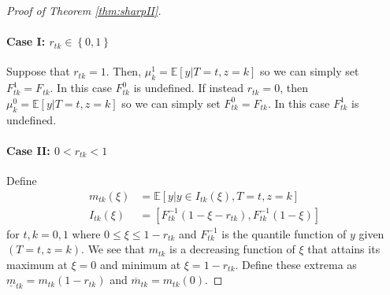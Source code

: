 \begin{proof}[Proof of Theorem \ref{thm:sharpII}]

\paragraph{Case I: $r_{tk}\in \left\{ 0,1 \right\}$}
Suppose that $r_{tk} = 1$.
Then, $\mu^1_k = \mathbb{E}[y|T=t,z=k]$ so we can simply set $F^1_{tk} = F_{tk}$.
In this case $F^0_{tk}$ is undefined.
If instead $r_{tk} = 0$, then $\mu^0_k = \mathbb{E}[y|T=t,z=k]$ so we can simply set $F^0_{tk} = F_{tk}$.
In this case $F^1_{tk}$ is undefined.

\paragraph{Case II: $0 < r_{tk} < 1$} 
Define
\begin{align*}
  m_{tk}(\xi) &= \mathbb{E}[y|y\in I_{tk}(\xi), T=t, z=k]\\
  I_{tk}(\xi) &= \left[ F^{-1}_{tk}(1 - \xi - r_{tk}), F^{-1}_{tk}(1 - \xi) \right]
\end{align*}
for $t,k = 0,1$ where $0 \leq \xi \leq 1 - r_{tk}$ and $F^{-1}_{tk}$ is the quantile function of $y$ given $(T=t, z=k)$.
We see that $m_{tk}$ is a decreasing function of $\xi$ that attains its maximum at $\xi = 0$ and minimum at $\xi = 1 - r_{tk}$.
Define these extrema as $\underline{m}_{tk} = m_{tk}(1 - r_{tk})$ and $\overline{m}_{tk} = m_{tk}(0)$.


\end{proof}
